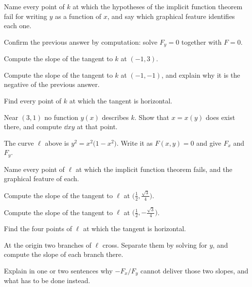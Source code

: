 \begin{problems}
\begin{gallery}
\hfill
{}
\end{gallery}

  \item Name every point of $k$ at which the hypotheses of the implicit
        function theorem fail for writing $y$ as a function of $x$, and say
        which graphical feature identifies each one.
  \item Confirm the previous answer by computation: solve $F_{y}=0$
        together with $F=0$.
  \item Compute the slope of the tangent to $k$ at $(-1,3)$.
  \item Compute the slope of the tangent to $k$ at $(-1,-1)$, and explain
        why it is the negative of the previous answer.
  \item Find every point of $k$ at which the tangent is horizontal.
  \item Near $(3,1)$ no function $y(x)$ describes $k$. Show that
        $x=x(y)$ does exist there, and compute $\dd{x}{y}$ at that point.
  \item The curve $\ell$ above is $y^{2}=x^{2}\bigl(1-x^{2}\bigr)$. Write it
        as $F(x,y)=0$ and give $F_{x}$ and $F_{y}$.
  \item Name every point of $\ell$ at which the implicit function theorem
        fails, and the graphical feature of each.
  \item Compute the slope of the tangent to $\ell$ at
        $\bigl(\tfrac12,\tfrac{\sqrt3}{4}\bigr)$.
  \item Compute the slope of the tangent to $\ell$ at
        $\bigl(\tfrac12,-\tfrac{\sqrt3}{4}\bigr)$.
  \item Find the four points of $\ell$ at which the tangent is horizontal.
  \item At the origin two branches of $\ell$ cross. Separate them by solving
        for $y$, and compute the slope of each branch there.
  \item Explain in one or two sentences why $-F_{x}/F_{y}$ cannot deliver
        those two slopes, and what has to be done instead.
\end{problems}

